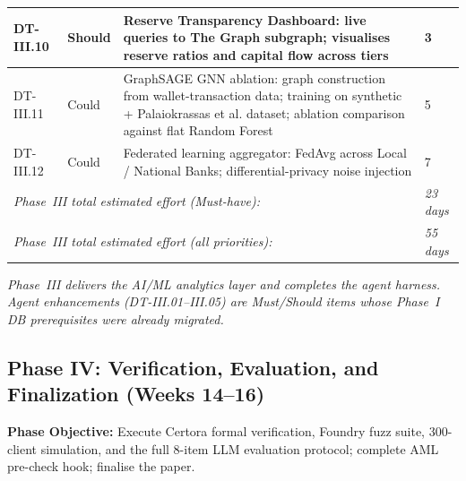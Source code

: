 \documentclass[12pt,a4paper]{report}
\begin{document}
\begin{table}[H]
\begin{tabular}{p{1.8cm}p{1.8cm}p{7.5cm}p{1.5cm}}
\hline
DT-III.10 & Should & Reserve Transparency Dashboard: live queries to The Graph subgraph; visualises reserve ratios and capital flow across tiers & 3 \\
\hline
DT-III.11 & Could & GraphSAGE GNN ablation: graph construction from wallet-transaction data; training on synthetic + Palaiokrassas et al. dataset; ablation comparison against flat Random Forest & 5 \\
\hline
DT-III.12 & Could & Federated learning aggregator: FedAvg across Local / National Banks; differential-privacy noise injection & 7 \\
\hline
\multicolumn{3}{l}{\textit{Phase~III total estimated effort (Must-have):}} & \textit{23 days} \\
\multicolumn{3}{l}{\textit{Phase~III total estimated effort (all priorities):}} & \textit{55 days} \\
\hline
\end{tabular}
\end{table}

\vspace{2pt}
\noindent\textit{\small Phase~III delivers the AI/ML analytics layer and completes the agent harness. Agent enhancements (DT-III.01--III.05) are Must/Should items whose Phase~I DB prerequisites were already migrated.}

\subsection{Phase IV: Verification, Evaluation, and Finalization (Weeks 14--16)}

\textbf{Phase Objective:} Execute Certora formal verification, Foundry fuzz suite,
300-client simulation, and the full 8-item LLM evaluation protocol;
complete AML pre-check hook; finalise the paper.
\end{document}
